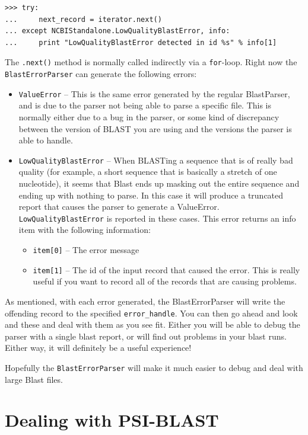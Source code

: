 \documentclass{report}
\begin{document}
\begin{verbatim}
>>> try:
...     next_record = iterator.next()
... except NCBIStandalone.LowQualityBlastError, info:
...     print "LowQualityBlastError detected in id %s" % info[1]
\end{verbatim}

The \verb|.next()| method is normally called indirectly via a \verb|for|-loop.
Right now the \verb|BlastErrorParser| can generate the following errors:

\begin{itemize}
  \item \verb|ValueError| -- This is the same error generated by the regular BlastParser, and is due to the parser not being able to parse a specific file. This is normally either due to a bug in the parser, or some kind of discrepancy between the version of BLAST you are using and the versions the parser is able to handle.

  \item \verb|LowQualityBlastError| -- When BLASTing a sequence that is of really bad quality (for example, a short sequence that is basically a stretch of one nucleotide), it seems that Blast ends up masking out the entire sequence and ending up with nothing to parse. In this case it will produce a truncated report that causes the parser to generate a ValueError. \verb|LowQualityBlastError| is reported in these cases. This error returns an info item with the following information:
  \begin{itemize}
    \item \verb|item[0]| -- The error message
    \item \verb|item[1]| -- The id of the input record that caused the error. This is really useful if you want to record all of the records that are causing problems.
  \end{itemize}
\end{itemize}

As mentioned, with each error generated, the BlastErrorParser will write the offending record to the specified \verb|error_handle|. You can then go ahead and look and these and deal with them as you see fit. Either you will be able to debug the parser with a single blast report, or will find out problems in your blast runs. Either way, it will definitely be a useful experience!

Hopefully the \verb|BlastErrorParser| will make it much easier to debug and deal with large Blast files.

\section{Dealing with PSI-BLAST}
\end{document}
